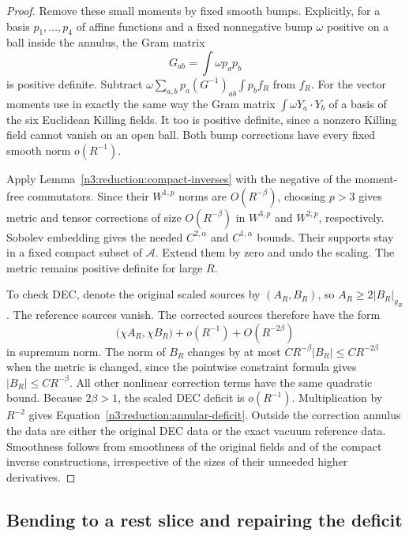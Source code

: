 \begin{proof}
Remove these small moments by fixed smooth bumps.  Explicitly, for a
basis $p_1,\ldots,p_4$ of affine functions and a fixed nonnegative bump
$\omega$ positive on a ball inside the annulus, the Gram matrix
\[
 G_{ab}=\int\omega p_ap_b
\]
is positive definite.  Subtract
$\omega\sum_{a,b}p_a(G^{-1})_{ab}\int p_bf_R$ from $f_R$.
For the vector moments use in exactly the same way the Gram matrix
$\int\omega Y_a\cdot Y_b$ of a basis of the six Euclidean Killing fields.
It too is positive definite, since a nonzero Killing field cannot vanish
on an open ball.  Both bump corrections have every fixed smooth norm
$o(R^{-1})$.

Apply Lemma~\ref{n3:reduction:compact-inverses} with the negative of the
moment-free commutators.  Since their $W^{1,p}$ norms are $O(R^{-\beta})$,
choosing $p>3$ gives metric and tensor corrections of size $O(R^{-\beta})$
in $W^{3,p}$ and $W^{2,p}$, respectively.  Sobolev embedding gives the
needed $C^{2,\alpha}$ and $C^{1,\alpha}$ bounds.  Their supports stay in
a fixed compact subset of $\mathcal A$.  Extend them by zero and undo
the scaling.  The metric remains positive definite for large $R$.

To check DEC, denote the original scaled sources by $(A_R,B_R)$, so
$A_R\ge2|B_R|_{g_R}$.  The reference sources vanish.  The corrected
sources therefore have the form
\[
 \bigl(\chi A_R,\chi B_R\bigr)
       +o(R^{-1})+O(R^{-2\beta})
\]
in supremum norm.  The norm of $B_R$ changes by at most
$CR^{-\beta}|B_R|\le CR^{-2\beta}$ when the metric is changed, since
the pointwise constraint formula gives $|B_R|\le CR^{-\beta}$.
All other nonlinear correction terms have the same quadratic bound.
Because $2\beta>1$, the scaled DEC deficit is $o(R^{-1})$.
Multiplication by $R^{-2}$ gives
Equation~\eqref{n3:reduction:annular-deficit}.  Outside the correction annulus
the data are either the original DEC data or the exact vacuum reference
data.  Smoothness follows from smoothness of the original fields and of
the compact inverse constructions, irrespective of the sizes of their
unneeded higher derivatives.
\end{proof}

\subsection{Bending to a rest slice and repairing the deficit}

